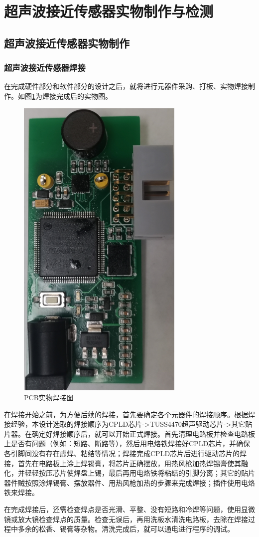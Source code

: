     \newpage
	\section{超声波接近传感器实物制作与检测}
 \subsection{超声波接近传感器实物制作}
 \subsubsection{超声波接近传感器焊接}
	在完成硬件部分和软件部分的设计之后，就将进行元器件采购、打板、实物焊接制作。如图\ref{PCB实物焊接图}为焊接完成后的实物图。
	\begin{figure}[ht]
	    \centering
	    \includegraphics[width=8cm,angle=-90]{figure/physical map.png}
	    \caption{PCB实物焊接图}
	    \label{PCB实物焊接图}
	\end{figure}
 在焊接开始之前，为方便后续的焊接，首先要确定各个元器件的焊接顺序。根据焊接经验，本设计选取的焊接顺序为CPLD芯片->TUSS4470超声驱动芯片->其它贴片器。在确定好焊接顺序后，就可以开始正式焊接。首先清理电路板并检查电路板上是否有问题（例如：短路、断路等），然后用电烙铁焊接好CPLD芯片，并确保各引脚间没有存在虚焊、粘结等情况；焊接完成CPLD芯片后进行驱动芯片的焊接，首先在电路板上涂上焊锡膏，将芯片正确摆放，用热风枪加热焊锡膏使其融化，并轻轻按压芯片使焊盘上锡，最后再用电烙铁将粘结的引脚分离；其它的贴片器件贼按照涂焊锡膏、摆放器件、用热风枪加热的步骤来完成焊接；插件使用电烙铁来焊接。\par
 在完成焊接后，还需检查焊点是否光滑、平整、没有短路和冷焊等问题，使用显微镜或放大镜检查焊点的质量。检查无误后，再用洗板水清洗电路板，去除在焊接过程中多余的松香、锡膏等杂物。清洗完成后，就可以通电进行程序的调试。

